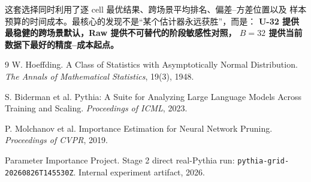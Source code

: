 \documentclass[11pt,a4paper]{ctexart}
\newcommand{\sourceid}[1]{\texttt{\small #1}}
\begin{document}
这套选择同时利用了逐 cell 最优结果、跨场景平均排名、偏差--方差位置以及
样本预算的时间成本。最核心的发现不是“某个估计器永远获胜”，而是：
\textbf{U-32 提供最稳健的跨场景默认，Raw 提供不可替代的阶段敏感性对照，
$B=32$ 提供当前数据下最好的精度--成本起点。}

\begin{thebibliography}{9}
W. Hoeffding.
\newblock A Class of Statistics with Asymptotically Normal Distribution.
\newblock \emph{The Annals of Mathematical Statistics}, 19(3), 1948.

S. Biderman et al.
\newblock Pythia: A Suite for Analyzing Large Language Models Across Training and Scaling.
\newblock \emph{Proceedings of ICML}, 2023.

P. Molchanov et al.
\newblock Importance Estimation for Neural Network Pruning.
\newblock \emph{Proceedings of CVPR}, 2019.

Parameter Importance Project.
\newblock Stage 2 direct real-Pythia run: \sourceid{pythia-grid-20260826T145530Z}.
\newblock Internal experiment artifact, 2026.
\end{thebibliography}
\end{document}
